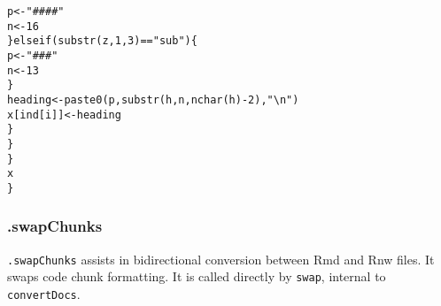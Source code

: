\documentclass{article}\usepackage[]{graphicx}\usepackage[]{color}
\makeatletter
\newcommand{\hlnum}[1]{\textcolor[rgb]{0.863,0.196,0.184}{#1}}%
\newcommand{\hlstr}[1]{\textcolor[rgb]{0.863,0.196,0.184}{#1}}%
\newcommand{\hlopt}[1]{\textcolor[rgb]{0.576,0.631,0.631}{#1}}%
\newcommand{\hlstd}[1]{\textcolor[rgb]{0.514,0.58,0.588}{#1}}%
\newcommand{\hlkwa}[1]{\textcolor[rgb]{0.796,0.294,0.086}{#1}}%
\newcommand{\hlkwb}[1]{\textcolor[rgb]{0.522,0.6,0}{#1}}%
\newcommand{\hlkwd}[1]{\textcolor[rgb]{0.576,0.631,0.631}{#1}}%
\newenvironment{kframe}{%
 \def\at@end@of@kframe{}%
 \ifinner\ifhmode%
  \def\at@end@of@kframe{\end{minipage}}%
  \begin{minipage}{\columnwidth}%
 \fi\fi%
 \def\FrameCommand##1{\hskip\@totalleftmargin \hskip-\fboxsep
 \colorbox{shadecolor}{##1}\hskip-\fboxsep
     \hskip-\linewidth \hskip-\@totalleftmargin \hskip\columnwidth}%
 \MakeFramed {\advance\hsize-\width
   \@totalleftmargin\z@ \linewidth\hsize
   \@setminipage}}%
 {\par\unskip\endMakeFramed%
 \at@end@of@kframe}
\newenvironment{knitrout}{}{} %
\makeatother
\begin{document}
\begin{knitrout}
\begin{kframe}
\begin{alltt}
                  \hlstd{p} \hlkwb{<-} \hlstr{"#### "}
                  \hlstd{n} \hlkwb{<-} \hlnum{16}
                \hlstd{\}} \hlkwa{else if} \hlstd{(}\hlkwd{substr}\hlstd{(z,} \hlnum{1}\hlstd{,} \hlnum{3}\hlstd{)} \hlopt{==} \hlstr{"sub"}\hlstd{) \{}
                  \hlstd{p} \hlkwb{<-} \hlstr{"### "}
                  \hlstd{n} \hlkwb{<-} \hlnum{13}
                \hlstd{\}}
                \hlstd{heading} \hlkwb{<-} \hlkwd{paste0}\hlstd{(p,} \hlkwd{substr}\hlstd{(h, n,} \hlkwd{nchar}\hlstd{(h)} \hlopt{-} \hlnum{2}\hlstd{),} \hlstr{"\textbackslash{}n"}\hlstd{)}
                \hlstd{x[ind[i]]} \hlkwb{<-} \hlstd{heading}
            \hlstd{\}}
        \hlstd{\}}
    \hlstd{\}}
    \hlstd{x}
\hlstd{\}}
\end{alltt}
\end{kframe}
\end{knitrout}

\subsubsection{.swapChunks}
\texttt{.swapChunks} assists in bidirectional conversion between Rmd and Rnw files.
It swaps code chunk formatting.
It is called directly by \texttt{swap}, internal to \texttt{convertDocs}.
\end{document}
